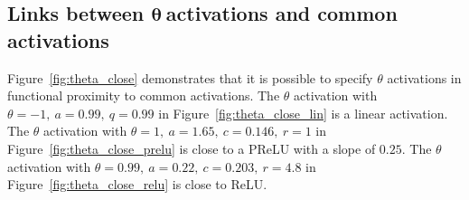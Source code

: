 \documentclass[final, 12pt]{colt2021} %
\newtheorem{prop}{Proposition}
\begin{document}









\subsection{Links between \texorpdfstring{$\boldsymbol{\theta}~$} aactivations and common activations}
\label{sec:theta_and_common_activations}

Figure~\ref{fig:theta_close}
demonstrates that it is possible to specify
$\theta$ activations in functional proximity to common activations.
The $\theta$ activation with
$\theta = -1,
~a = 0.99,
~q = 0.99$
in Figure~\ref{fig:theta_close_lin}
is a linear activation.
The $\theta$ activation with
$\theta = 1,
~a = 1.65,
~c = 0.146,
~r = 1$
in Figure~\ref{fig:theta_close_prelu}
is close to a PReLU with a slope of $0.25$.
The $\theta$ activation with
$
\theta = 0.99,
~a = 0.22,
~c = 0.203,
~r = 4.8
$
in Figure~\ref{fig:theta_close_relu}
is close to ReLU.
\end{document}

